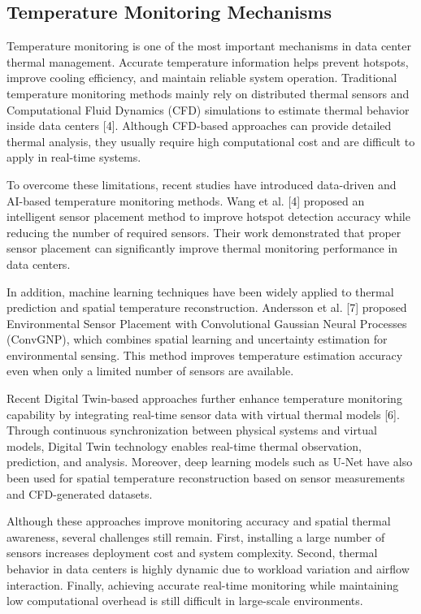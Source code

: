 \documentclass[conference]{IEEEtran}
\begin{document}
\subsection{Temperature Monitoring Mechanisms}
Temperature monitoring is one of the most important mechanisms in data center thermal management. Accurate temperature information helps prevent hotspots, improve cooling efficiency, and maintain reliable system operation. Traditional temperature monitoring methods mainly rely on distributed thermal sensors and Computational Fluid Dynamics (CFD) simulations to estimate thermal behavior inside data centers [4]. Although CFD-based approaches can provide detailed thermal analysis, they usually require high computational cost and are difficult to apply in real-time systems.

To overcome these limitations, recent studies have introduced data-driven and AI-based temperature monitoring methods. Wang et al. [4] proposed an intelligent sensor placement method to improve hotspot detection accuracy while reducing the number of required sensors. Their work demonstrated that proper sensor placement can significantly improve thermal monitoring performance in data centers.

In addition, machine learning techniques have been widely applied to thermal prediction and spatial temperature reconstruction. Andersson et al. [7] proposed Environmental Sensor Placement with Convolutional Gaussian Neural Processes (ConvGNP), which combines spatial learning and uncertainty estimation for environmental sensing. This method improves temperature estimation accuracy even when only a limited number of sensors are available.

Recent Digital Twin-based approaches further enhance temperature monitoring capability by integrating real-time sensor data with virtual thermal models [6]. Through continuous synchronization between physical systems and virtual models, Digital Twin technology enables real-time thermal observation, prediction, and analysis. Moreover, deep learning models such as U-Net have also been used for spatial temperature reconstruction based on sensor measurements and CFD-generated datasets.

Although these approaches improve monitoring accuracy and spatial thermal awareness, several challenges still remain. First, installing a large number of sensors increases deployment cost and system complexity. Second, thermal behavior in data centers is highly dynamic due to workload variation and airflow interaction. Finally, achieving accurate real-time monitoring while maintaining low computational overhead is still difficult in large-scale environments.
\end{document}
